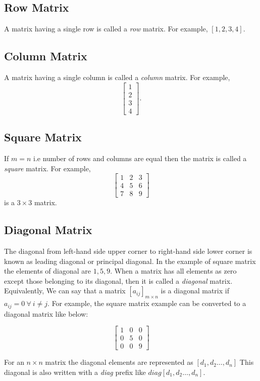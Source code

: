 \subsection{Row Matrix}
A matrix having a single row is called a \textit{row} matrix. For example, $[1,2, 3, 4]$.

\subsection{Column Matrix}
A matrix having a single column is called a \textit{column} matrix. For example, \[\begin{bmatrix}1\\2\\3\\4\end{bmatrix}.\]

\subsection{Square Matrix}
If $m = n$ i.e number of rows and columns are equal then the matrix is called a \textit{square} matrix. For example,
\[\begin{bmatrix}1 & 2 & 3 \\ 4 & 5 & 6 \\ 7 & 8 & 9\end{bmatrix}\] is a $3\times 3$ matrix.

\subsection{Diagonal Matrix}
The diagonal from left-hand side upper corner to right-hand side lower corner is known as leading diagonal or principal diagonal. In the example of square
matrix the elements of diagonal are $1, 5, 9$. When a matrix has all elements as zero except those belonging to its diagonal, then
it is called a \textit{diagonal} matrix. Equivalently, We can say that a matrix $[a_{ij}]_{m\times n}$ is a diagonal matrix if $a_{ij} =
0~\forall~i\neq j$. For example, the square matrix example can be converted to a diagonal matrix like below:

\[\begin{bmatrix}1 & 0 & 0 \\ 0 & 5 & 0 \\ 0 & 0 & 9\end{bmatrix}\]

For an $n\times n$ matrix the diagonal elements are represented as $[d_1, d_2 \ldots, d_n]$ This diagonal is also written with a
\textit{diag} prefix like $diag [d_1, d_2 \ldots, d_n]$.

